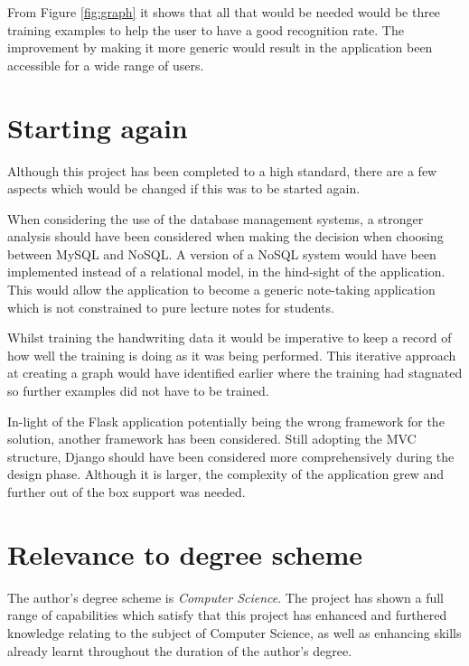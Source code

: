 From Figure \ref{fig:graph} it shows that all that would be needed would be three training examples to help the user to have a good recognition rate. The improvement by making it more generic would result in the application been accessible for a wide range of users.

\section{Starting again}
Although this project has been completed to a high standard, there are a few aspects which would be changed if this was to be started again.

When considering the use of the database management systems, a stronger analysis should have been considered when making the decision when choosing between MySQL and NoSQL. A version of a NoSQL system would have been implemented instead of a relational model, in the hind-sight of the application. This would allow the application to become a generic note-taking application which is not constrained to pure lecture notes for students.

Whilst training the handwriting data it would be imperative to keep a record of how well the training is doing as it was being performed. This iterative approach at creating a graph would have identified earlier where the training had stagnated so further examples did not have to be trained.

In-light of the Flask application potentially being the wrong framework for the solution, another framework has been considered. Still adopting the MVC structure, Django should have been considered more comprehensively during the design phase. Although it is larger, the complexity of the application grew and further out of the box support was needed.

\section{Relevance to degree scheme}
The author's degree scheme is \textit{Computer Science}. The project has shown a full range of capabilities which satisfy that this project has enhanced and furthered knowledge relating to the subject of Computer Science, as well as enhancing skills already learnt throughout the duration of the author's degree.

